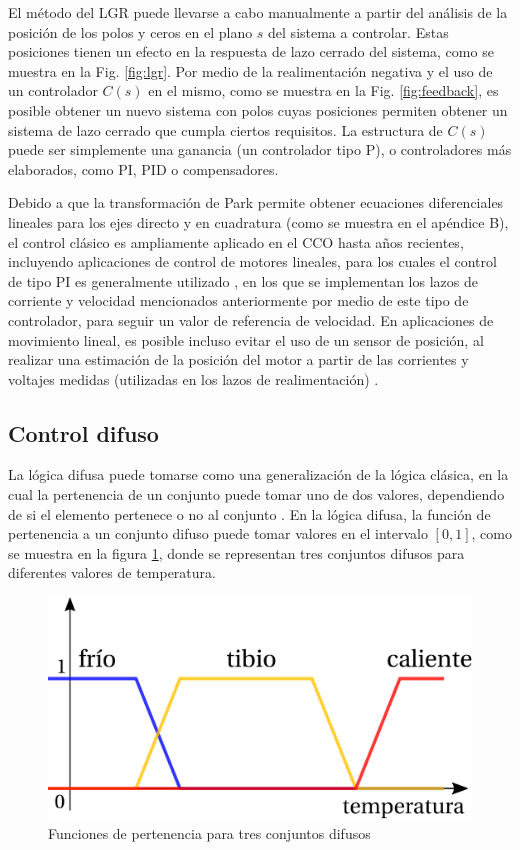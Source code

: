 El método del LGR puede llevarse a cabo manualmente a partir del análisis de la posición de los polos y ceros en el plano $s$ del sistema a controlar. Estas posiciones tienen un efecto en la respuesta de lazo cerrado del sistema, como se muestra en la Fig. \ref{fig:lgr}. Por medio de la realimentación negativa y el uso de un controlador $C(s)$ en el mismo, como se muestra en la Fig. \ref{fig:feedback}, es posible obtener un nuevo sistema con polos cuyas posiciones permiten obtener un sistema de lazo cerrado que cumpla ciertos requisitos. La estructura de $C(s)$ puede ser simplemente una ganancia (un controlador tipo P), o controladores más elaborados, como PI, PID o compensadores.

Debido a que la transformación de Park permite obtener ecuaciones diferenciales lineales para los ejes directo y en cuadratura (como se muestra en el apéndice B), el control clásico es ampliamente aplicado en el CCO hasta años recientes, incluyendo aplicaciones de control de motores lineales, para los cuales el control de tipo PI es generalmente utilizado \cite{ramana2015,cheema2013,motlagh2012,gu2003}, en los que se implementan los lazos de corriente y velocidad mencionados anteriormente por medio de este tipo de controlador, para seguir un valor de referencia de velocidad. En aplicaciones de movimiento lineal, es posible incluso evitar el uso de un sensor de posición, al realizar una estimación de la posición del motor a partir de las corrientes y voltajes medidas (utilizadas en los lazos de realimentación) \cite{cheema2013}.

\subsection{Control difuso}

La lógica difusa \cite{zadeh1965} puede tomarse como una generalización de la lógica clásica, en la cual la pertenencia de un conjunto puede tomar uno de dos valores, dependiendo de si el elemento pertenece o no al conjunto \cite{wang1997}. En la lógica difusa, la función de pertenencia a un conjunto difuso puede tomar valores en el intervalo $[0, 1]$, como se muestra en la figura \ref{fig:fuzzymf}, donde se representan tres conjuntos difusos para diferentes valores de temperatura.

\begin{figure}[b]
\centering
\includegraphics[scale=0.3]{../img/Diseno_de_un_controlador_de_velocidad/fuzzymf.eps}
\caption{Funciones de pertenencia para tres conjuntos difusos}
\label{fig:fuzzymf}
\end{figure}

